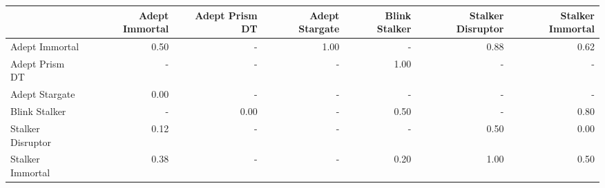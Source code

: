 \begin{tabular}{lrrrrrr}
\toprule
{} &  Adept Immortal &  Adept Prism DT &  Adept Stargate &  Blink Stalker &  Stalker Disruptor &  Stalker Immortal \\
\midrule
Adept Immortal    &            0.50 &             - &            1.00 &            - &               0.88 &              0.62 \\
Adept Prism DT    &             - &             - &             - &           1.00 &                - &               - \\
Adept Stargate    &            0.00 &             - &             - &            - &                - &               - \\
Blink Stalker     &             - &            0.00 &             - &           0.50 &                - &              0.80 \\
Stalker Disruptor &            0.12 &             - &             - &            - &               0.50 &              0.00 \\
Stalker Immortal  &            0.38 &             - &             - &           0.20 &               1.00 &              0.50 \\
\bottomrule
\end{tabular}
